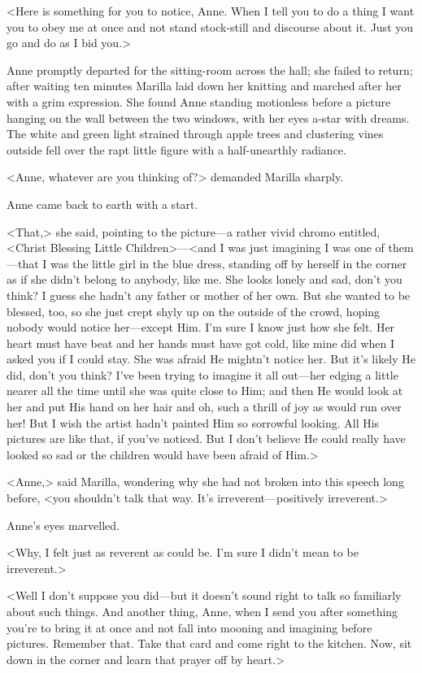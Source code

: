 <Here is something for you to notice, Anne. When I tell you to do a thing I want you to obey me at once and not stand stock-still and discourse about it. Just you go and do as I bid you.>

Anne promptly departed for the sitting-room across the hall; she failed to return; after waiting ten minutes Marilla laid down her knitting and marched after her with a grim expression. She found Anne standing motionless before a picture hanging on the wall between the two windows, with her eyes a-star with dreams. The white and green light strained through apple trees and clustering vines outside fell over the rapt little figure with a half-unearthly radiance.

<Anne, whatever are you thinking of?> demanded Marilla sharply.

Anne came back to earth with a start.

<That,> she said, pointing to the picture—a rather vivid chromo entitled, <Christ Blessing Little Children>—<and I was just imagining I was one of them—that I was the little girl in the blue dress, standing off by herself in the corner as if she didn't belong to anybody, like me. She looks lonely and sad, don't you think? I guess she hadn't any father or mother of her own. But she wanted to be blessed, too, so she just crept shyly up on the outside of the crowd, hoping nobody would notice her—except Him. I'm sure I know just how she felt. Her heart must have beat and her hands must have got cold, like mine did when I asked you if I could stay. She was afraid He mightn't notice her. But it's likely He did, don't you think? I've been trying to imagine it all out—her edging a little nearer all the time until she was quite close to Him; and then He would look at her and put His hand on her hair and oh, such a thrill of joy as would run over her! But I wish the artist hadn't painted Him so sorrowful looking. All His pictures are like that, if you've noticed. But I don't believe He could really have looked so sad or the children would have been afraid of Him.>

<Anne,> said Marilla, wondering why she had not broken into this speech long before, <you shouldn't talk that way. It's irreverent—positively irreverent.>

Anne's eyes marvelled.

<Why, I felt just as reverent as could be. I'm sure I didn't mean to be irreverent.>

<Well I don't suppose you did—but it doesn't sound right to talk so familiarly about such things. And another thing, Anne, when I send you after something you're to bring it at once and not fall into mooning and imagining before pictures. Remember that. Take that card and come right to the kitchen. Now, sit down in the corner and learn that prayer off by heart.>

